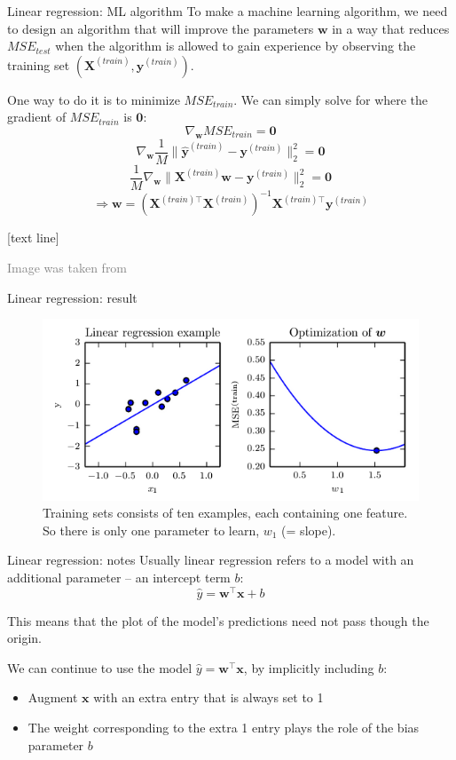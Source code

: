 \documentclass[dvipsnames]{beamer}
\newcommand{\referencefootnote}[1]{\setbeamertemplate{footline}[text line]{%
\parbox{0.9\paperwidth}{\vspace*{-23pt}\tiny{\textcolor{gray}{#1}}\hfill\scriptsize\insertframenumber}}}
\begin{document}
				\begin{frame}{Linear regression: ML algorithm}
				To make a machine learning algorithm, we need to design an algorithm that will improve the parameters $\mathbf{w}$ in a way that reduces $MSE_{test}$ when the algorithm is allowed to gain experience by observing the training set $(\mathbf{X}^{(train)}, \mathbf{y}^{(train)})$. %
				
				One way to do it is to minimize $MSE_{train}$. We can simply solve for where the gradient of $MSE_{train}$ is $\mathbf{0}$: %
				\[
				\nabla_{\mathbf{w}}MSE_{train} = \mathbf{0} %
				\]
				\[
				\nabla_{\mathbf{w}}\frac{1}{M}\|\hat{\mathbf{y}}^{(train)} - \mathbf{y}^{(train)}\|_{2}^{2}  = \mathbf{0} %
				\]
				\[
				\frac{1}{M}\nabla_{\mathbf{w}}\|\mathbf{X}^{(train)}\mathbf{w} - \mathbf{y}^{(train)}\|_{2}^{2}  = \mathbf{0} %
				\]
				\[
				\Rightarrow \mathbf{w}= (\mathbf{X}^{(train)\top}\mathbf{X}^{(train)})^{-1}\mathbf{X}^{(train)\top}\mathbf{y}^{(train)}
				\]
				
		\end{frame}
		
		{ \referencefootnote{Image was taken from \cite{Goodfellow_et_al_2016}}
			\begin{frame}{Linear regression: result}
				 \begin{figure}
					\center
					\includegraphics[scale=.6]{figures/regression.png} 
					\caption{Training sets consists of ten examples, each containing one feature. So there is only one parameter to learn, $w_1$ (= slope).}
					\end{figure}
		\end{frame}
		}
		\begin{frame}{Linear regression: notes}
		Usually linear regression refers to a model with an additional parameter -- an intercept term $b$:
		\[
		\hat{y} = \mathbf{w}^{\top}\mathbf{x}+b
		\]
		
		This means that the plot of the model's predictions need not pass though the origin.
		
		We can continue to use the model $\hat{y} = \mathbf{w}^{\top}\mathbf{x}$, by implicitly including $b$:
		\begin{itemize}
			\item Augment $\mathbf{x}$ with an extra entry that is always set to 1
			\item The weight corresponding to the extra 1 entry plays the role of the bias parameter $b$
		\end{itemize}
		\end{frame}
		
\end{document}
